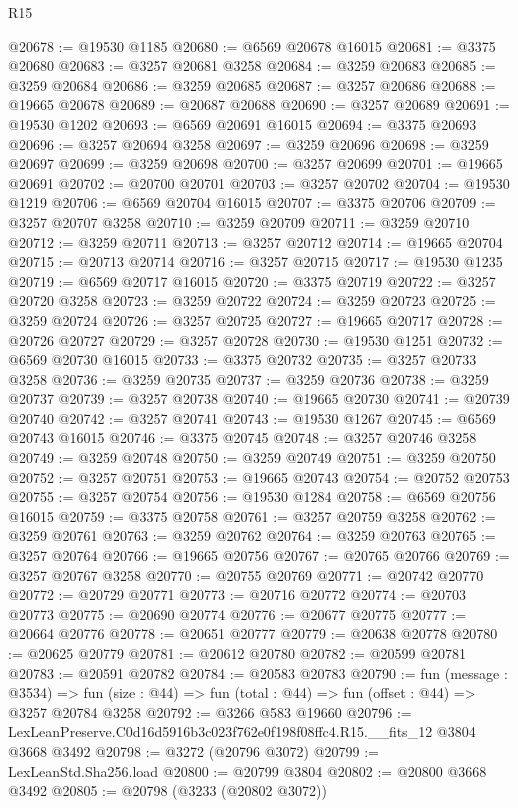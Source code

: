 \begin{lexlean}{R15}
\begin{coremodule}
@20678 := @19530 @1185
@20680 := @6569 @20678 @16015
@20681 := @3375 @20680
@20683 := @3257 @20681 @3258
@20684 := @3259 @20683
@20685 := @3259 @20684
@20686 := @3259 @20685
@20687 := @3257 @20686
@20688 := @19665 @20678
@20689 := @20687 @20688
@20690 := @3257 @20689
@20691 := @19530 @1202
@20693 := @6569 @20691 @16015
@20694 := @3375 @20693
@20696 := @3257 @20694 @3258
@20697 := @3259 @20696
@20698 := @3259 @20697
@20699 := @3259 @20698
@20700 := @3257 @20699
@20701 := @19665 @20691
@20702 := @20700 @20701
@20703 := @3257 @20702
@20704 := @19530 @1219
@20706 := @6569 @20704 @16015
@20707 := @3375 @20706
@20709 := @3257 @20707 @3258
@20710 := @3259 @20709
@20711 := @3259 @20710
@20712 := @3259 @20711
@20713 := @3257 @20712
@20714 := @19665 @20704
@20715 := @20713 @20714
@20716 := @3257 @20715
@20717 := @19530 @1235
@20719 := @6569 @20717 @16015
@20720 := @3375 @20719
@20722 := @3257 @20720 @3258
@20723 := @3259 @20722
@20724 := @3259 @20723
@20725 := @3259 @20724
@20726 := @3257 @20725
@20727 := @19665 @20717
@20728 := @20726 @20727
@20729 := @3257 @20728
@20730 := @19530 @1251
@20732 := @6569 @20730 @16015
@20733 := @3375 @20732
@20735 := @3257 @20733 @3258
@20736 := @3259 @20735
@20737 := @3259 @20736
@20738 := @3259 @20737
@20739 := @3257 @20738
@20740 := @19665 @20730
@20741 := @20739 @20740
@20742 := @3257 @20741
@20743 := @19530 @1267
@20745 := @6569 @20743 @16015
@20746 := @3375 @20745
@20748 := @3257 @20746 @3258
@20749 := @3259 @20748
@20750 := @3259 @20749
@20751 := @3259 @20750
@20752 := @3257 @20751
@20753 := @19665 @20743
@20754 := @20752 @20753
@20755 := @3257 @20754
@20756 := @19530 @1284
@20758 := @6569 @20756 @16015
@20759 := @3375 @20758
@20761 := @3257 @20759 @3258
@20762 := @3259 @20761
@20763 := @3259 @20762
@20764 := @3259 @20763
@20765 := @3257 @20764
@20766 := @19665 @20756
@20767 := @20765 @20766
@20769 := @3257 @20767 @3258
@20770 := @20755 @20769
@20771 := @20742 @20770
@20772 := @20729 @20771
@20773 := @20716 @20772
@20774 := @20703 @20773
@20775 := @20690 @20774
@20776 := @20677 @20775
@20777 := @20664 @20776
@20778 := @20651 @20777
@20779 := @20638 @20778
@20780 := @20625 @20779
@20781 := @20612 @20780
@20782 := @20599 @20781
@20783 := @20591 @20782
@20784 := @20583 @20783
@20790 := fun (message : @3534) =>
  fun (size : @44) => fun (total : @44) => fun (offset : @44) => @3257 @20784 @3258
@20792 := @3266 @583 @19660
@20796 := LexLeanPreserve.C0d16d5916b3c023f762e0f198f08ffc4.R15.__fits_12 @3804 @3668 @3492
@20798 := @3272 (@20796 @3072)
@20799 := LexLeanStd.Sha256.load
@20800 := @20799 @3804
@20802 := @20800 @3668 @3492
@20805 := @20798 (@3233 (@20802 @3072))

\end{coremodule}
\end{lexlean}
